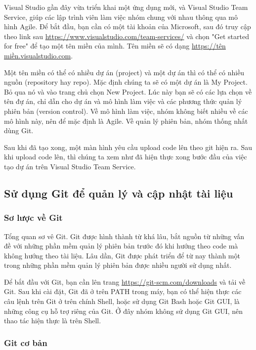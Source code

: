 \documentclass[12pt,a4paper]{report}
\begin{document}
		Visual Studio gần đây vừa triển khai một ứng dụng mới, và Visual Studio Team Service, giúp các lập trình viên làm việc nhóm chung với nhau thông qua mô hình Agile. Để bắt đầu, bạn cần có một tài khoản của Microsoft, sau đó truy cập theo link sau \url{https://www.visualstudio.com/team-services/} và chọn "Get started for free" để tạo một tên miền của mình. Tên miền sẽ có dạng \url{https://tên miền.visualstudio.com}.\par
		Một tên miền có thể có nhiều dự án (project) và một dự án thì có thể có nhiều nguồn (repository hay repo). Mặc định chúng ta sẽ có một dự án là My Project. Bỏ qua nó và vào trang chủ chọn New Project. Lúc này bạn sẽ có các lựa chọn về tên đự án, chỉ dẫn cho dự án và mô hình làm việc và các phương thức quản lý phiên bản (version control). Về mô hình làm việc, nhóm không biết nhiều về các mô hình này, nên để mặc định là Agile. Về quản lý phiên bản, nhóm thống nhất dùng Git.\par
		Sau khi đã tạo xong, một màn hình yêu cầu upload code lên theo git hiện ra. Sau khi upload code lên, thì chúng ta xem như đã hiện thực xong bước đầu của việc tạo dự án trên Visual Studio Team Service.
		

		\subsection{Sử dụng Git để quản lý và cập nhật tài liệu}

		\subsubsection{Sơ lược về Git}
		Tổng quan sơ vê Git. Git được hình thành từ khá lâu, bắt nguồn từ những vấn đề với những phần mềm quản lý phiên bản trước đó khi hướng theo code mà không hướng theo tài liệu. Lâu dần, Git được phát triển để từ nay thành một trong những phần mềm quản lý phiên bản được nhiều người sử dụng nhất. \par
		Để bắt đầu với Git, bạn cần lên trang \url{https://git-scm.com/downloads} và tải về Git. Sau khi cài đặt, Git đã ở trên PATH trong máy, bạn có thể hiện thực các câu lệnh trên Git ở trên chính Shell, hoặc sử dụng Git Bash hoặc Git GUI, là những công cụ hỗ trợ riêng của Git. Ở đây nhóm không sử dụng Git GUI, nên thao tác hiện thực là trên Shell.\par
		
		\subsubsection{Git cơ bản}
\end{document}
